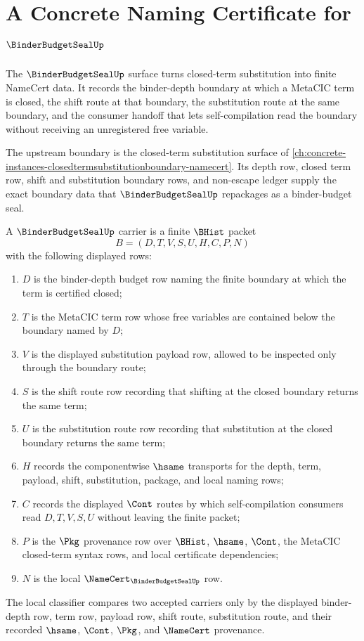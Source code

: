 \chapter{A Concrete Naming Certificate for $\BinderBudgetSealUp$}
\label{ch:concrete-instances-binderbudgetseal-namecert}

The $\BinderBudgetSealUp$ surface turns closed-term substitution into finite NameCert data. It records the binder-depth boundary at which a MetaCIC term is closed, the shift route at that boundary, the substitution route at the same boundary, and the consumer handoff that lets self-compilation read the boundary without receiving an unregistered free variable.

The upstream boundary is the closed-term substitution surface of \autoref{ch:concrete-instances-closedtermsubstitutionboundary-namecert}. Its depth row, closed term row, shift and substitution boundary rows, and non-escape ledger supply the exact boundary data that $\BinderBudgetSealUp$ repackages as a binder-budget seal.

\begin{definition}
\label{def:binder-budget-seal-carrier}
A $\BinderBudgetSealUp$ carrier is a finite $\BHist$ packet
$$
B=(D,T,V,S,U,H,C,P,N)
$$
with the following displayed rows:
\begin{enumerate}
\item $D$ is the binder-depth budget row naming the finite boundary at which the term is certified closed;
\item $T$ is the MetaCIC term row whose free variables are contained below the boundary named by $D$;
\item $V$ is the displayed substitution payload row, allowed to be inspected only through the boundary route;
\item $S$ is the shift route row recording that shifting at the closed boundary returns the same term;
\item $U$ is the substitution route row recording that substitution at the closed boundary returns the same term;
\item $H$ records the componentwise $\hsame$ transports for the depth, term, payload, shift, substitution, package, and local naming rows;
\item $C$ records the displayed $\Cont$ routes by which self-compilation consumers read $D,T,V,S,U$ without leaving the finite packet;
\item $P$ is the $\Pkg$ provenance row over $\BHist$, $\hsame$, $\Cont$, the MetaCIC closed-term syntax rows, and local certificate dependencies;
\item $N$ is the local $\NameCert_{\BinderBudgetSealUp}$ row.
\end{enumerate}
The local classifier compares two accepted carriers only by the displayed binder-depth row, term row, payload row, shift route, substitution route, and their recorded $\hsame$, $\Cont$, $\Pkg$, and $\NameCert$ provenance.
\end{definition}

